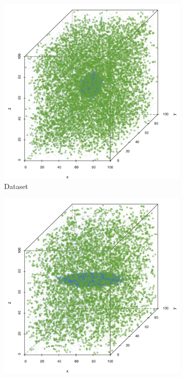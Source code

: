 
\begin{figure}
	\centering
	\begin{subfigure}{0.23\textwidth}
		\centering
		\includegraphics[keepaspectratio=true, width=\textwidth, height=0.23\textheight]{discussion/img/ferdosi_1_abs_error_mbeSmallerThansambe}
		\caption{Dataset \ferdosiOne}
		\label{fig:discussion:singleSphere:mbeLowerError:ferdosi1}
	\end{subfigure}
	\begin{subfigure}{0.23\textwidth}
		\centering
		\includegraphics[keepaspectratio=true, width=\textwidth, height=0.23\textheight]{discussion/img/baakman_1_abs_error_mbeSmallerThansambe}

\end{subfigure}
\end{figure}

